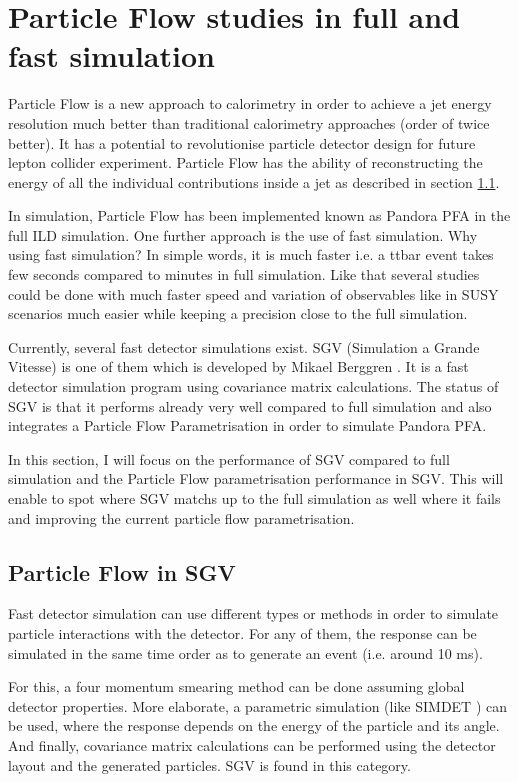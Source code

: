 \chapter{Particle Flow studies in full and fast simulation}

Particle Flow is a new approach to calorimetry in order to achieve a jet energy resolution much better than traditional calorimetry approaches (order of twice better). It has a potential to revolutionise particle detector design for future lepton collider experiment. Particle Flow has the ability of reconstructing the energy of all the individual contributions inside a jet as described in section \ref{}.

In simulation, Particle Flow has been implemented known as Pandora PFA in the full ILD simulation. One further approach is the use of fast simulation. Why using fast simulation? In simple words, it is much faster i.e. a ttbar event takes few seconds compared to minutes in full simulation. Like that several studies could be done with much faster speed and variation of observables like in SUSY scenarios much easier while keeping a precision close to the full simulation.

Currently, several fast detector simulations exist. SGV (Simulation a Grande Vitesse) is one of them which is developed by Mikael Berggren \cite{Berggren2012}. It is a fast detector simulation program using covariance matrix calculations. The status of SGV is that it performs already very well compared to full simulation and also integrates a Particle Flow Parametrisation in order to simulate Pandora PFA.

In this section, I will focus on the performance of SGV compared to full simulation and the Particle Flow parametrisation performance in SGV. This will enable to spot where SGV matchs up to the full simulation as well where it fails and improving the current particle flow parametrisation.

\section{Particle Flow in SGV}

Fast detector simulation can use different types or methods in order to simulate particle interactions with the detector. For any of them, the response can be simulated in the same time order as to generate an event (i.e. around 10 ms).

For this, a four momentum smearing method can be done assuming global detector properties. More elaborate, a parametric simulation (like SIMDET \cite{Pohl2002}) can be used, where the response depends on the energy of the particle and its angle.
And finally, covariance matrix calculations can be performed using the detector layout and the generated particles. SGV is found in this category.

